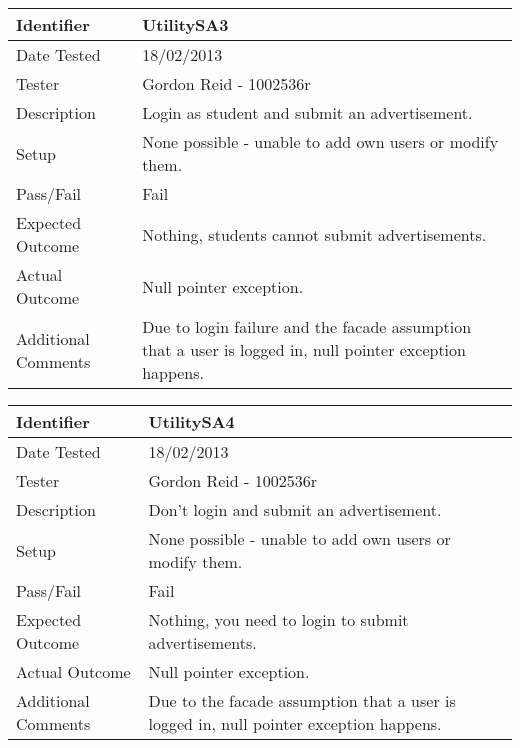 \begin{tabularx}{\textwidth}{|T|L|}
\hline
Identifier & UtilitySA3\\
\hline
Date Tested & 18/02/2013\\
\hline
Tester & Gordon Reid - 1002536r\\
\hline
Description & Login as student and submit an advertisement.\\
\hline
Setup & None possible - unable to add own users or modify them.\\
\hline
Pass/Fail & Fail\\
\hline
Expected Outcome & Nothing, students cannot submit advertisements.\\
\hline
Actual Outcome & Null pointer exception.\\
\hline
Additional Comments & Due to login failure and the facade assumption that a user 
is logged in, null pointer exception happens.\\
\hline
\end{tabularx}

\vspace{2em}

\begin{tabularx}{\textwidth}{|T|L|}
\hline
Identifier & UtilitySA4\\
\hline
Date Tested & 18/02/2013\\
\hline
Tester & Gordon Reid - 1002536r\\
\hline
Description & Don't login and submit an advertisement.\\
\hline
Setup & None possible - unable to add own users or modify them.\\
\hline
Pass/Fail & Fail\\
\hline
Expected Outcome & Nothing, you need to login to submit advertisements.\\
\hline
Actual Outcome & Null pointer exception.\\
\hline
Additional Comments & Due to the facade assumption that a user 
is logged in, null pointer exception happens.\\
\hline
\end{tabularx}
